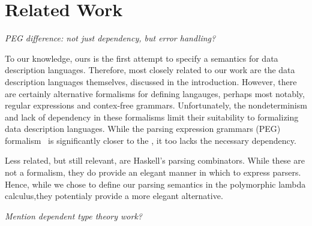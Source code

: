 \section{Related Work}

{\em PEG difference: not just dependency, but error handling?}

To our knowledge, ours is the first attempt to specify a semantics for
data description languages. Therefore, most closely related to our
work are the data description languages themselves, discussed in the
introduction.  However, there are certainly alternative formalisms for
defining langauges, perhaps most notably, regular expressions and
contex-free grammars. Unfortunately, the nondeterminism and lack of
dependency in these formalisms limit their suitability to formalizing
data description languages. While the parsing expression grammars
(PEG) formalism~\cite{ford:parsing-expression-grammars} is
significantly closer to the \ddc{}, it too lacks the necessary
dependency.

Less related, but still relevant, are Haskell's parsing
combinators. While these are not a formalism, they do provide an
elegant manner in which to express parsers. Hence, while we chose to
define our parsing semantics in the polymorphic lambda calculus,they
potentialy provide a more elegant alternative.

{\em Mention dependent type theory work?}
